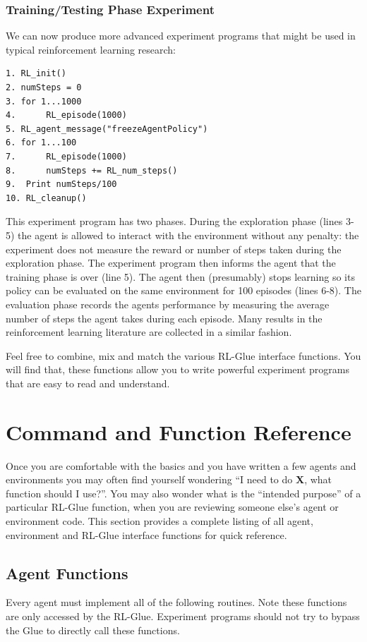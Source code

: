 \documentclass[11pt]{article}
\begin{document}
\subsubsection{Training/Testing Phase Experiment}
We can now produce more advanced experiment programs that might be used in typical reinforcement learning research:
\begin{verbatim}
1. RL_init()
2. numSteps = 0
3. for 1...1000
4.      RL_episode(1000)
5. RL_agent_message("freezeAgentPolicy")
6. for 1...100
7.      RL_episode(1000)
8.      numSteps += RL_num_steps()
9.  Print numSteps/100
10. RL_cleanup()
\end{verbatim}

This experiment program has two phases. During the exploration phase (lines 3-5) the agent is allowed to interact with the environment without any penalty: the experiment does not measure the reward or number of steps taken during the exploration phase. The experiment program then informs the agent that the training phase is over (line 5). The agent then (presumably) stops learning so its policy can be evaluated on the same environment for 100 episodes (lines 6-8). The evaluation phase records the agents performance by measuring the average number of steps the agent takes during each episode. Many results in the reinforcement learning literature are collected in a similar fashion.

Feel free to combine, mix and match the various RL-Glue interface functions. You will find that, these functions allow you to write powerful experiment programs that are easy to read and understand. 


\section{Command and Function Reference}
\label{ref}
Once you are comfortable with the basics and you have written a few agents and environments you may often find yourself wondering ``I need to do {\bf X}, what function should I use?''. You may also wonder what is the ``intended purpose'' of a particular RL-Glue function, when you are reviewing someone else's agent or environment code. This section provides a complete listing of all agent, environment and RL-Glue interface functions for quick reference.
\subsection{Agent Functions}
 
Every agent must implement all of the following routines. Note these functions are only accessed by the RL-Glue. Experiment programs should not try to bypass the Glue to directly call these functions.
\end{document}
